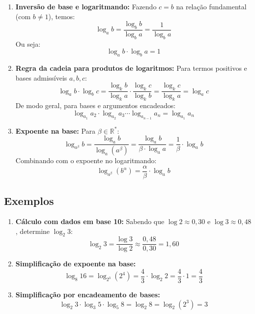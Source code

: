 \documentclass[12pt,a4paper]{report}
\begin{document}
	\begin{destaque}
		\begin{enumerate}[label=\textbf{\arabic*.}]
			\item \textbf{Inversão de base e logaritmando:}  
			Fazendo $c = b$ na relação fundamental (com $b \neq 1$), temos:
			$$\log_a b = \frac{\log_b b}{\log_b a} = \frac{1}{\log_b a}$$
			Ou seja:
			$$\log_a b \cdot \log_b a = 1$$
			
			\item \textbf{Regra da cadeia para produtos de logaritmos:}  
			Para termos positivos e bases admissíveis $a, b, c$:
			$$\log_a b \cdot \log_b c = \frac{\log_k b}{\log_k a} \cdot \frac{\log_k c}{\log_k b} = \frac{\log_k c}{\log_k a} = \log_a c$$
			De modo geral, para bases e argumentos encadeados:
			$$\log_{a_1} a_2 \cdot \log_{a_2} a_3 \dotsm \log_{a_{n-1}} a_n = \log_{a_1} a_n$$
			
			\item \textbf{Expoente na base:}  
			Para $\beta \in \mathbb{R}^*$:
			$$\log_{a^\beta} b = \frac{\log_a b}{\log_a (a^\beta)} = \frac{\log_a b}{\beta \cdot \log_a a} = \frac{1}{\beta} \cdot \log_a b$$
			Combinando com o expoente no logaritmando:
			$$\log_{a^\beta} (b^\alpha) = \frac{\alpha}{\beta} \cdot \log_a b$$
		\end{enumerate}
	\end{destaque}
	
	\subsection*{Exemplos}
	
	\begin{enumerate}[label=\textbf{\alph*)}]
		\item \textbf{Cálculo com dados em base 10:}  
		Sabendo que $\log 2 \approx 0{,}30$ e $\log 3 \approx 0{,}48$, determine $\log_2 3$:
		$$\log_2 3 = \frac{\log 3}{\log 2} \approx \frac{0{,}48}{0{,}30} = 1{,}60$$
		
		\item \textbf{Simplificação de expoente na base:}  
		$$\log_8 16 = \log_{2^3} (2^4) = \frac{4}{3} \cdot \log_2 2 = \frac{4}{3} \cdot 1 = \frac{4}{3}$$
		
		\item \textbf{Simplificação por encadeamento de bases:}  
		$$\log_2 3 \cdot \log_3 5 \cdot \log_5 8 = \log_2 8 = \log_2 (2^3) = 3$$
	\end{enumerate}
	
\end{document}
